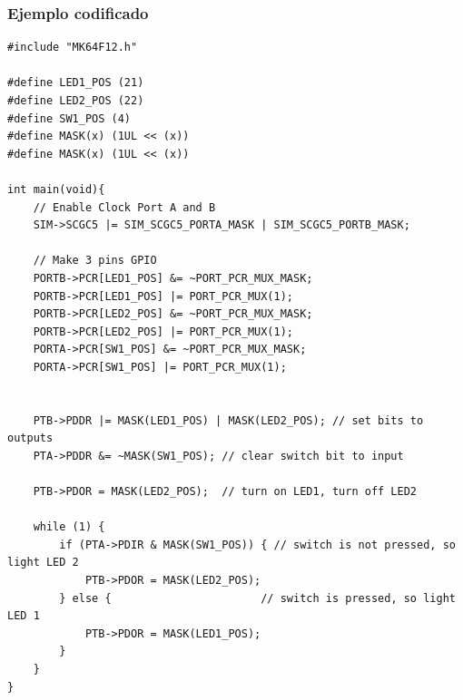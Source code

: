 \documentclass[10.5pt,scale=1.0,t,aspectratio=169,hyperref={pdfpagelabels=false}]{beamer}
\begin{document}
\begin{frame}[fragile]
	\frametitle{Ejemplo codificado}
	\begin{multicols}{2}
		\begin{lstlisting}[style=CStyle]
#include "MK64F12.h"

#define LED1_POS (21)
#define LED2_POS (22)
#define SW1_POS (4)
#define MASK(x) (1UL << (x))
#define MASK(x) (1UL << (x))

int main(void){
	// Enable Clock Port A and B
	SIM->SCGC5 |= SIM_SCGC5_PORTA_MASK | SIM_SCGC5_PORTB_MASK;
	
	// Make 3 pins GPIO
	PORTB->PCR[LED1_POS] &= ~PORT_PCR_MUX_MASK;
	PORTB->PCR[LED1_POS] |= PORT_PCR_MUX(1);
	PORTB->PCR[LED2_POS] &= ~PORT_PCR_MUX_MASK;
	PORTB->PCR[LED2_POS] |= PORT_PCR_MUX(1);
	PORTA->PCR[SW1_POS] &= ~PORT_PCR_MUX_MASK;
	PORTA->PCR[SW1_POS] |= PORT_PCR_MUX(1);
	
	
	PTB->PDDR |= MASK(LED1_POS) | MASK(LED2_POS); // set bits to outputs
	PTA->PDDR &= ~MASK(SW1_POS); // clear switch bit to input
	
	PTB->PDOR = MASK(LED2_POS);  // turn on LED1, turn off LED2
	
	while (1) {
		if (PTA->PDIR & MASK(SW1_POS)) { // switch is not pressed, so light LED 2
			PTB->PDOR = MASK(LED2_POS);
		} else {	                   // switch is pressed, so light LED 1
			PTB->PDOR = MASK(LED1_POS);
		}
	}
}
		\end{lstlisting}
	\end{multicols}	
\end{frame}
\end{document}
